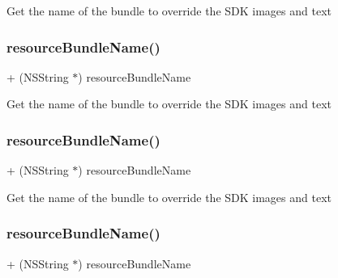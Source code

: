 Get the name of the bundle to override the S\+DK images and text \mbox{\label{interfaceFBSettings_ad87ff4e3c9577a22d9a329b12137f976}} 
\subsubsection{\texorpdfstring{resource\+Bundle\+Name()}{resourceBundleName()}\hspace{0.1cm}{\footnotesize\ttfamily [2/5]}}
{\footnotesize\ttfamily + (N\+S\+String $\ast$) resource\+Bundle\+Name \begin{DoxyParamCaption}{ }\end{DoxyParamCaption}}

Get the name of the bundle to override the S\+DK images and text \mbox{\label{interfaceFBSettings_ad87ff4e3c9577a22d9a329b12137f976}} 
\subsubsection{\texorpdfstring{resource\+Bundle\+Name()}{resourceBundleName()}\hspace{0.1cm}{\footnotesize\ttfamily [3/5]}}
{\footnotesize\ttfamily + (N\+S\+String $\ast$) resource\+Bundle\+Name \begin{DoxyParamCaption}{ }\end{DoxyParamCaption}}

Get the name of the bundle to override the S\+DK images and text \mbox{\label{interfaceFBSettings_ad87ff4e3c9577a22d9a329b12137f976}} 
\subsubsection{\texorpdfstring{resource\+Bundle\+Name()}{resourceBundleName()}\hspace{0.1cm}{\footnotesize\ttfamily [4/5]}}
{\footnotesize\ttfamily + (N\+S\+String $\ast$) resource\+Bundle\+Name \begin{DoxyParamCaption}{ }\end{DoxyParamCaption}}

